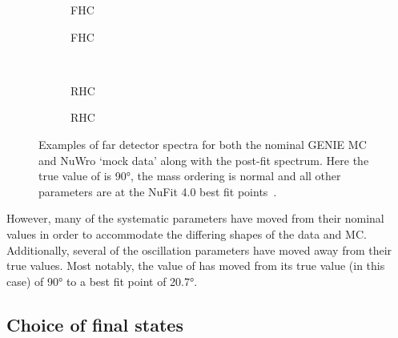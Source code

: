 \begin{figure}[h]
	\begin{subfigure}[t]{0.5\linewidth}
		\begin{adjustbox}{max totalsize=\linewidth, center}
			
		\end{adjustbox}	
		\caption{\numu FHC}	
	\end{subfigure}	
	\hfill
	\begin{subfigure}[t]{0.5\linewidth}
		\begin{adjustbox}{max totalsize=\linewidth, center}
			
		\end{adjustbox}	
		\caption{\nue FHC}	
	\end{subfigure} \\ 
	\begin{subfigure}[t]{0.5\linewidth}
		\begin{adjustbox}{max totalsize=\linewidth, center}
			
		\end{adjustbox}	
		\caption{\numu RHC}	
	\end{subfigure}	
	\hfill
	\begin{subfigure}[t]{0.5\linewidth}
		\begin{adjustbox}{max totalsize=\linewidth, center}
			
		\end{adjustbox}		
		\caption{\nue RHC}
	\end{subfigure}
	\caption[Examples of far detector spectra for both the nominal GENIE MC and NuWro `mock data' along with the post-fit spectrum]{Examples of far detector spectra for both the nominal GENIE MC and NuWro `mock data' along with the post-fit spectrum. Here the true value of \dcp is \ang{90}, the mass ordering is normal and all other parameters are at the NuFit 4.0 best fit points~\cite{nufit}.}
	\label{fig:fdSamplesPostFit}
\end{figure}

However, many of the systematic parameters have moved from their nominal values in order to accommodate the differing shapes of the data and MC.
Additionally, several of the oscillation parameters have moved away from their true values.
Most notably, the value of \dcp has moved from its true value (in this case) of \ang{90} to a best fit point of \ang{20.7}.

\subsection{Choice of final states}

